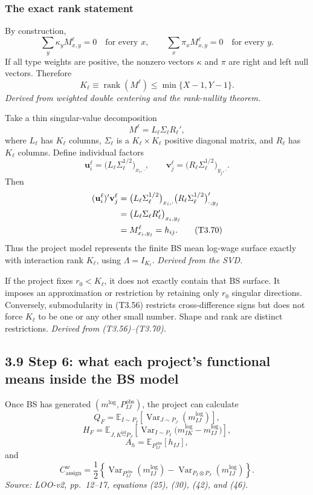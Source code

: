\documentclass[11pt]{article}
\begin{document}
\subsubsection{The exact rank statement}

By construction,
\[
\sum_y\kappa_yM^\ell_{x,y}=0
\quad\text{for every }x,
\qquad
\sum_x\pi_xM^\ell_{x,y}=0
\quad\text{for every }y.
\tag{T3.66}
\]
If all type weights are positive, the nonzero vectors \(\kappa\) and \(\pi\)
are right and left null vectors.  Therefore
\[
K_\ell
\equiv
\operatorname{rank}(M^\ell)
\leq
\min\{X-1,Y-1\}.
\tag{T3.67}
\]
\textit{Derived from weighted double centering and the rank-nullity theorem.}

Take a thin singular-value decomposition
\[
M^\ell=L_\ell\Sigma_\ell R_\ell',
\tag{T3.68}
\]
where \(L_\ell\) has \(K_\ell\) columns, \(\Sigma_\ell\) is a
\(K_\ell\times K_\ell\) positive diagonal matrix, and \(R_\ell\) has
\(K_\ell\) columns.  Define individual factors
\[
\mathbf u_i^\ell
=
\bigl(L_\ell\Sigma_\ell^{1/2}\bigr)_{x_i,\cdot},
\qquad
\mathbf v_j^\ell
=
\bigl(R_\ell\Sigma_\ell^{1/2}\bigr)_{y_j,\cdot}.
\tag{T3.69}
\]
Then
\begin{align}
(\mathbf u_i^\ell)'\mathbf v_j^\ell
&=
\bigl(L_\ell\Sigma_\ell^{1/2}\bigr)_{x_i,\cdot}
\bigl(R_\ell\Sigma_\ell^{1/2}\bigr)'_{\cdot,y_j} \notag\\
&=
\bigl(L_\ell\Sigma_\ell R_\ell'\bigr)_{x_i,y_j} \notag\\
&=
M^\ell_{x_i,y_j}
=h_{ij}.
\tag{T3.70}
\end{align}
Thus the project model represents the finite BS mean log-wage surface exactly
with interaction rank \(K_\ell\), using \(\Lambda=I_{K_\ell}\).
\textit{Derived from the SVD.}

If the project fixes \(r_0<K_\ell\), it does not exactly contain that BS
surface.  It imposes an approximation or restriction by retaining only
\(r_0\) singular directions.  Conversely, submodularity in (T3.56) restricts
cross-difference signs but does not force \(K_\ell\) to be one or any other
small number.  Shape and rank are distinct restrictions.
\textit{Derived from (T3.56)--(T3.70).}

\subsection{3.9 Step 6: what each project's functional means inside the BS model}

Once BS has generated \((m^{\log},P^{\mathrm{obs}}_{IJ})\), the project can
calculate
\[
Q_F
=
\mathbb E_{I\sim P_I}
\left[
\operatorname{Var}_{J\sim P_J}(m^{\log}_{IJ})
\right],
\tag{T3.71}
\]
\[
H_F
=
\mathbb E_{J,K\stackrel{\mathrm{iid}}{\sim}P_J}
\left[
\operatorname{Var}_{I\sim P_I}
\bigl(m^{\log}_{IK}-m^{\log}_{IJ}\bigr)
\right],
\tag{T3.72}
\]
\[
A_h
=
\mathbb E_{P^{\mathrm{obs}}_{IJ}}[h_{IJ}],
\tag{T3.73}
\]
and
\[
C^w_{\mathrm{assign}}
=
\frac12\left\{
\operatorname{Var}_{P^{\mathrm{obs}}_{IJ}}(m^{\log}_{IJ})
-
\operatorname{Var}_{P_I\otimes P_J}(m^{\log}_{IJ})
\right\}.
\tag{T3.74}
\]
\textit{Source: LOO-v2, pp.\ 12--17, equations (25), (30), (42), and
(46).}
\end{document}
